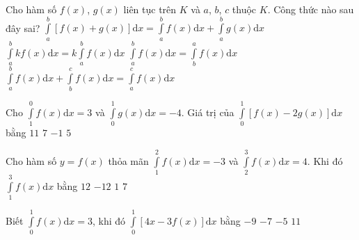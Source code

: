 \begin{ex}%
Cho hàm số $ f(x) $, $ g(x) $ liên tục trên $ K $ và $ a $, $ b $, $ c $ thuộc $ K $. Công thức nào sau đây sai?
\choice
{$ \displaystyle \int\limits_{a}^{b}\left[f(x)+g(x)\right]\mathrm{d}x =\displaystyle \int\limits_{a}^{b}f(x)\mathrm{d}x+\displaystyle \int\limits_{a}^{b}g(x)\mathrm{d}x $}
{$ \displaystyle \int\limits_{a}^{b}kf(x)\mathrm{d}x=k\displaystyle \int\limits_{a}^{b}f(x)\mathrm{d}x $}
{\True$ \displaystyle \int\limits_{a}^{b}f(x)\mathrm{d}x=\displaystyle \int\limits_{b}^{a}f(x)\mathrm{d}x $}
{$ \displaystyle \int\limits_{a}^{b}f(x)\mathrm{d}x+\displaystyle \int\limits_{b}^{c}f(x)\mathrm{d}x=\displaystyle \int\limits_{a}^{c}f(x)\mathrm{d}x $}
\loigiai{

}
\end{ex}

\begin{ex}%
Cho $ \displaystyle \int\limits_{1}^{0}f(x)\mathrm{d}x=3 $ và $ \displaystyle \int\limits_{0}^{1}g(x)\mathrm{d}x=-4 $. Giá trị của $ \displaystyle \int\limits_{0}^{1}\left[f(x)-2g(x)\right]\mathrm{d}x $ bằng
\choice
{$ 11 $}
{$ 7 $}
{$ -1 $}
{\True $ 5 $}
\end{ex}

\begin{ex}%
Cho hàm số $ y=f(x) $ thỏa mãn $ \displaystyle \int\limits_{1}^{2}f(x)\mathrm{d}x=-3 $ và $ \displaystyle \int\limits_{2}^{3}f(x)\mathrm{d}x=4 $. Khi đó $ \displaystyle \int\limits_{1}^{3}f(x)\mathrm{d}x $ bằng
\choice
{$ 12 $}
{$ -12 $}
{\True $ 1 $}
{$ 7 $}
\end{ex}

\begin{ex}%
Biết $ \displaystyle \int\limits_{0}^{1}f(x)\mathrm{d}x=3 $, khi đó $ \displaystyle \int\limits_{0}^{1}\left[4x-3f(x)\right]\mathrm{d}x $ bằng
\choice
{$ -9 $}
{\True $ -7 $}
{$ -5 $}
{$ 11 $}
\end{ex}

